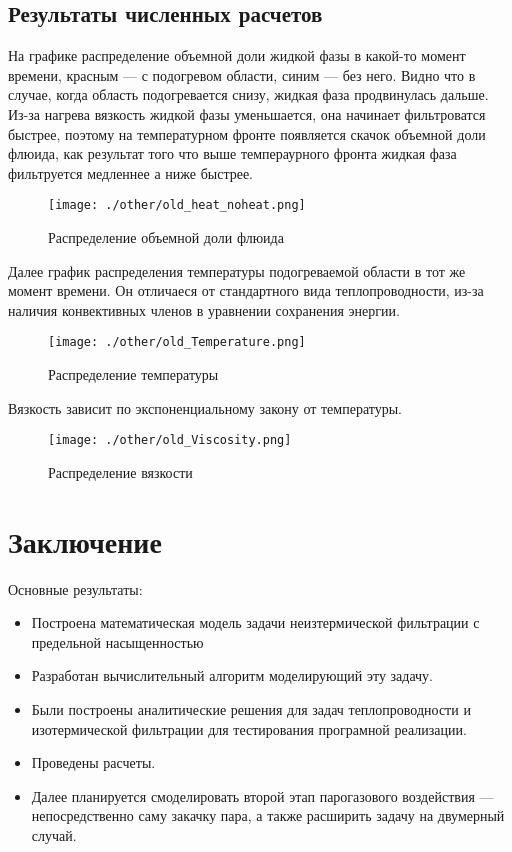 \documentclass[12pt,a4paper]{article}
\begin{document}
\subsection{Результаты численных расчетов}
На графике распределение объемной доли жидкой фазы в какой-то момент времени, красным --- с подогревом области, синим --- без него. Видно что в случае, когда область подогревается снизу, жидкая фаза продвинулась дальше. Из-за нагрева вязкость жидкой фазы уменьшается, она начинает фильтроватся быстрее, поэтому на температурном фронте появляется скачок объемной доли флюида, как результат того что выше темпераурного фронта жидкая фаза фильтруется медленнее а ниже быстрее. 

\begin{figure}[ht!]
\begin{center}
\texttt{[image: ./other/old\_heat\_noheat.png]}
\caption{Распределение объемной доли флюида}
\end{center}
\end{figure}

Далее график распределения температуры подогреваемой области в тот же момент времени. Он отличаеся от стандартного вида теплопроводности, из-за наличия конвективных членов в уравнении сохранения энергии.
\newpage
\begin{figure}[ht!]
\begin{center}
\texttt{[image: ./other/old\_Temperature.png]}
\caption{Распределение температуры}
\end{center}
\end{figure}

Вязкость зависит по экспоненциальному закону от температуры.

\begin{figure}[ht!]
\begin{center}
\texttt{[image: ./other/old\_Viscosity.png]}
\caption{Распределение вязкости}
\end{center}
\end{figure}

\newpage
\section{Заключение}
Основные результаты:
\begin{itemize}
\item Построена математическая модель задачи неизтермической фильтрации с предельной насыщенностью
\item Разработан вычислительный алгоритм моделирующий эту задачу.
\item Были построены аналитические решения для задач теплопроводности и изотермической фильтрации для тестирования програмной реализации.
\item Проведены расчеты.
\item Далее планируется смоделировать второй этап парогазового воздействия --- непосредственно саму закачку пара, а также расширить задачу на двумерный случай. 
\end{itemize}
\newpage
 
 
\end{document}

